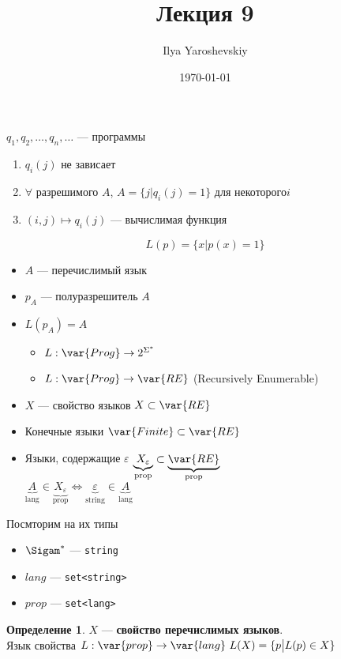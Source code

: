 \documentclass[english]{article}
\author{Ilya Yaroshevskiy}
\date{\today}
\title{Лекция 9}
\theoremstyle{plain}
\theoremstyle{remark}
\theoremstyle{definition}
\newtheorem*{definition}{Определение}
\begin{document}
\maketitle
\tableofcontents

\(q_1, q_2, \dots, q_n, \dots\) --- программы
\begin{enumerate}
\item \(q_i(j)\) не зависает
\item \(\forall\) разрешимого \(A\), \(A = \{j \big| q_i(j) = 1\}\) для некоторого\(i\)
\item \((i, j) \mapsto q_i(j)\) --- вычислимая функция
\end{enumerate}


\[ L(p) = \{x \big| p(x) = 1\} \]
\begin{itemize}
\item \(A\) --- перечислимый язык \\
\item \(p_A\) --- полуразрешитель \(A\)
\item \(L(p_A) = A\)
\begin{itemize}
\item \(L: \var{Prog} \to 2^{\Sigma^*}\)
\item \(L: \var{Prog} \to \var{RE}\) (Recursively Enumerable)
\end{itemize}
\item \(X\) --- свойство языков \(X \subset \var{RE}\)
\item Конечные языки \(\var{Finite} \subset \var{RE}\)
\item Языки, содержащие \(\varepsilon\) \(\underbrace{X_\varepsilon}_{\text{prop}} \subset \underbrace{\var{RE}}_{\text{prop}}\) \\
\(\underbrace{A}_{\text{lang}} \in \underbrace{X_\varepsilon}_{\text{prop}} \Leftrightarrow \underbrace{\varepsilon}_{\text{string}} \in \underbrace{A}_{\text{lang}}\)
\end{itemize}
Посмторим на их типы
\begin{itemize}
\item \(\Sigam^*\) --- \texttt{string}
\item \(lang\) --- \texttt{set<string>}
\item \(prop\) --- \texttt{set<lang>}
\end{itemize}
\begin{definition}
\(X\) --- \textbf{свойство перечислимых языков}. \\
Язык свойства \(L: \var{prop} \to \var{lang}\ L(X) = \{p \big| L(p) \in X\}\)
\end{definition}
\end{document}
